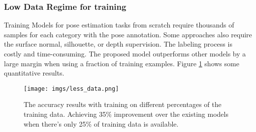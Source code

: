 \documentclass[letterpaper, 10 pt, conference]{ieeeconf}  \pdfoutput=1
\begin{document}
\subsubsection{Low Data Regime for training}
Training Models for pose estimation tasks from scratch require thousands of samples for each category with the pose annotation. Some approaches \cite{pix3d} also require the surface normal, silhouette, or depth supervision. The labeling process is costly and time-consuming. The proposed model outperforms other models by a large margin when using a fraction of training examples. Figure \ref{less-data} shows some quantitative results.
\begin{figure}[htbp]
\begin{center}
\texttt{[image: imgs/less\_data.png]}
\end{center}
   \caption{The accuracy results with training on different percentages of the training data. Achieving 35\% improvement over the existing models when there's only 25\% of training data is available.}
\label{less-data}
\end{figure}


\begin{table}
\centering
{}
\caption{The comparison of our model with the Pix3D model. Results are only for the chair category for different number of bins.}
\label{compare_with_pix3d}
\end{table}

\begin{table}
\centering
{}
\caption{The average accuracy of the azimuth and elevation for the different number of bins.}
\label{difrent_bins}
\end{table}
\end{document}
